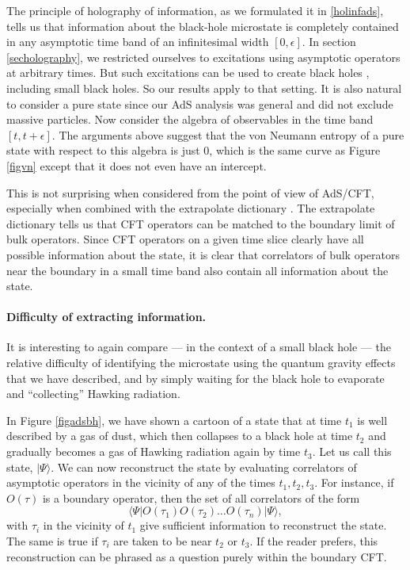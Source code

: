 \documentclass[12pt]{article}
\newcommand{\be}{\begin{equation}}
\newcommand{\ee}{\end{equation}}
\begin{document}
The principle of holography of information, as we formulated it in \ref{holinfads}, tells us that information about the black-hole microstate is completely contained in any asymptotic time band of an infinitesimal width $[0, \epsilon]$. In section
 \ref{secholography}, we restricted ourselves to excitations using asymptotic operators at arbitrary times. But such excitations can be used to create black holes \cite{Bhattacharyya:2009uu}, including small black holes. So our results apply to that setting.  It is also natural to consider a pure state since our AdS analysis was general and did not exclude massive particles. Now consider the algebra of observables in the time band $[t, t + \epsilon]$.  The arguments above suggest that the von Neumann entropy of a pure state with respect to this algebra is just $0$, which is the same curve as Figure \ref{figvn} except that it does not even have an intercept.

This is not surprising when considered from the point of view of AdS/CFT, especially when combined with the extrapolate dictionary \cite{Banks:1998dd}. The extrapolate dictionary tells us that CFT operators can be matched to the boundary limit of bulk operators. Since CFT operators on a given time slice clearly have all possible information about the state, it is clear that correlators of bulk operators near the boundary in a small time band also contain all information about the state.

\paragraph{\bf Difficulty of extracting information.}
It is interesting to again compare --- in the context of a small black hole --- the relative difficulty of identifying the microstate using the quantum gravity effects that we have described,  and by simply waiting for the black hole to evaporate and ``collecting'' Hawking radiation.

In Figure \ref{figadsbh}, we have shown a cartoon of a state that at time $t_1$ is well described by a gas of dust, which then collapses to a black hole at time $t_2$ and gradually becomes a gas of Hawking radiation again by time $t_3$.  Let us call this state, $|\Psi \rangle$.  We can now reconstruct the state by evaluating correlators of asymptotic operators in the vicinity of  any of the times $t_1, t_2, t_3$. For instance, if $O(\tau)$ is a boundary operator, then the set of all correlators of the form
\be
\langle \Psi | O(\tau_{1}) O(\tau_{2}) \ldots O(\tau_{n}) |\Psi \rangle,
\ee
with $\tau_i$ in the vicinity of $t_1$ give sufficient information to reconstruct the state. The same is true if $\tau_i$ are taken to be near $t_2$ or $t_3$.  If the reader prefers, this reconstruction can be phrased as a question purely within the boundary CFT.
\end{document}
